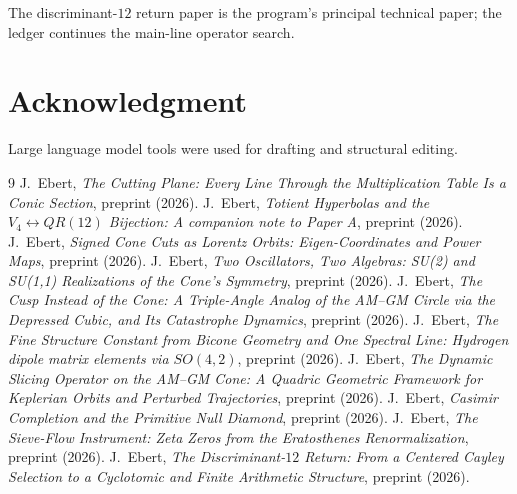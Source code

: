 \documentclass[11pt]{amsart}
\theoremstyle{remark}
\begin{document}
The discriminant-$12$ return paper \cite{Ebert2026D12} is the
program's principal technical paper; the ledger continues the
main-line operator search.

\section*{Acknowledgment}
Large language model tools were used for drafting and structural editing.

\begin{thebibliography}{9}
 J.~Ebert, \emph{The Cutting Plane: Every Line
Through the Multiplication Table Is a Conic Section}, preprint (2026).
 J.~Ebert, \emph{Totient Hyperbolas and the
$V_4\leftrightarrow QR(12)$ Bijection: A companion note to Paper A},
preprint (2026).
 J.~Ebert, \emph{Signed Cone Cuts as
Lorentz Orbits: Eigen-Coordinates and Power Maps}, preprint (2026).
 J.~Ebert, \emph{Two Oscillators, Two
Algebras: SU(2) and SU(1,1) Realizations of the Cone's Symmetry},
preprint (2026).
 J.~Ebert, \emph{The Cusp Instead of the Cone:
A Triple-Angle Analog of the AM--GM Circle via the Depressed Cubic,
and Its Catastrophe Dynamics}, preprint (2026).
 J.~Ebert, \emph{The Fine Structure Constant
from Bicone Geometry and One Spectral Line: Hydrogen dipole matrix
elements via $SO(4,2)$}, preprint (2026).
 J.~Ebert, \emph{The Dynamic Slicing Operator
on the AM--GM Cone: A Quadric Geometric Framework for Keplerian Orbits
and Perturbed Trajectories}, preprint (2026).
 J.~Ebert, \emph{Casimir Completion and
the Primitive Null Diamond}, preprint (2026).
 J.~Ebert, \emph{The Sieve-Flow Instrument:
Zeta Zeros from the Eratosthenes Renormalization}, preprint (2026).
 J.~Ebert, \emph{The Discriminant-$12$ Return:
From a Centered Cayley Selection to a Cyclotomic and Finite Arithmetic
Structure}, preprint (2026).
\end{thebibliography}
\end{document}
